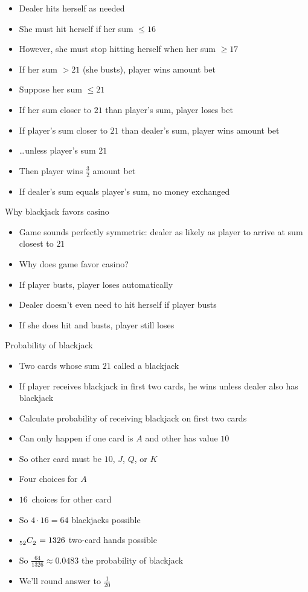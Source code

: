 \documentclass[handout]{beamer}
\theoremstyle{definition}
\newcommand\ncr[2]{\tensor[_{#1}]C{_{#2}}}
\begin{document}
\begin{frame}
\begin{itemize}
\item Dealer hits herself as needed
\item She \alert{must} hit herself if her sum $\le 16$
\item However, she must stop hitting herself when her sum $\ge 17$
\item If her sum $>21$ (she \alert{busts}), player wins amount bet
\item Suppose her sum $\le 21$
\item If her sum closer to $21$ than player's sum,
player loses bet
\item If player's sum closer to $21$ than dealer's sum,
player wins amount bet
\item \dots unless player's sum $21$
\item Then player wins $\frac{3}{2}$ amount bet
\item If dealer's sum equals player's sum, no money exchanged
\end{itemize}
\end{frame}

\begin{frame}{Why blackjack favors casino}
\begin{itemize}
\item Game sounds perfectly symmetric: dealer as likely
as player to arrive at sum closest to $21$
\item Why does game favor casino?
\item If player busts, player loses automatically
\item Dealer doesn't even need to hit herself if player busts
\item If she does hit and busts, player still loses
\end{itemize}
\end{frame}

\begin{frame}{Probability of blackjack}
\begin{itemize}
\item Two cards whose sum $21$ called a \alert{blackjack}
\item If player receives blackjack in first two cards,
he wins unless dealer also has blackjack
\item Calculate probability of receiving blackjack on first two cards
\item Can only happen if one card is $A$ and other
has value $10$
\item So other card must be $10$, $J$, $Q$, or $K$
\item Four choices for $A$
\item $16$~choices for other card
\item So $4\cdot 16=64$ blackjacks possible
\item $\ncr{52}{2}=1326$ two-card hands possible 
\item So $\frac{64}{1326}\approx 0.0483$ the probability of blackjack
\item We'll round answer to $\frac{1}{20}$
\end{itemize}
\end{frame}
\end{document}
